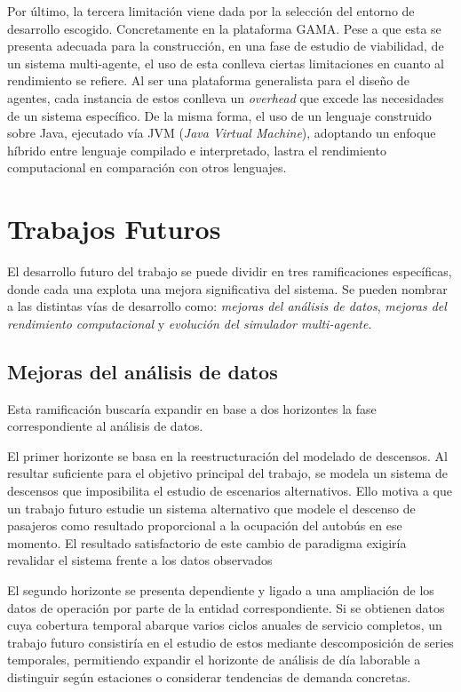 Por último, la tercera limitación viene dada por la selección del entorno de desarrollo escogido. Concretamente en la plataforma GAMA.
Pese a que esta se presenta adecuada para la construcción, en una fase de estudio de viabilidad, de un sistema multi-agente,
el uso de esta conlleva ciertas limitaciones en cuanto al rendimiento se refiere. Al ser una plataforma generalista para el diseño de
agentes, cada instancia de estos conlleva un \textit{overhead} que excede las necesidades de un sistema específico. De la misma forma,
el uso de un lenguaje construido sobre Java, ejecutado vía JVM (\textit{Java Virtual Machine}), adoptando un enfoque híbrido entre
lenguaje compilado e interpretado, lastra el rendimiento computacional en comparación con otros lenguajes.



\section{Trabajos Futuros}\label{section:future}
El desarrollo futuro del trabajo se puede dividir en tres ramificaciones específicas, donde cada una explota una mejora significativa
del sistema. Se pueden nombrar a las distintas vías de desarrollo como: \textit{mejoras del análisis de datos},
\textit{mejoras del rendimiento computacional} y \textit{evolución del simulador multi-agente}.

\subsection{Mejoras del análisis de datos}
Esta ramificación buscaría expandir en base a dos horizontes la fase correspondiente al análisis de datos.

El primer horizonte se basa en la reestructuración del modelado de descensos. Al resultar suficiente para el objetivo principal del trabajo,
se modela un sistema de descensos que imposibilita el estudio de escenarios alternativos. Ello motiva a que un trabajo futuro estudie
un sistema alternativo que modele el descenso de pasajeros como resultado proporcional a la ocupación del autobús en ese momento.
El resultado satisfactorio de este cambio de paradigma exigiría revalidar el sistema frente a los datos observados

El segundo horizonte se presenta dependiente y ligado a una ampliación de los datos de operación por parte de la entidad correspondiente.
Si se obtienen datos cuya cobertura temporal abarque varios ciclos anuales de servicio completos, un trabajo futuro consistiría en el estudio de estos
mediante descomposición de series temporales, permitiendo expandir el horizonte de análisis de día laborable a distinguir según
estaciones o considerar tendencias de demanda concretas.

